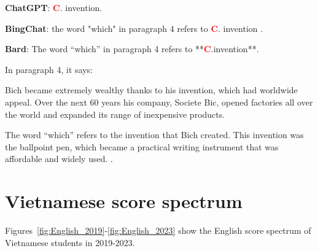 \documentclass[11pt]{article}
\begin{document}
\begin{mdframed}[linewidth=1pt,linecolor=red]
	\textbf{ChatGPT}: \textcolor{red}{\textbf{C}}. invention.  
	
	\textbf{BingChat}:  the word "which" in paragraph 4 refers to \textcolor{red}{\textbf{C}}. invention .
	
	\textbf{Bard}: The word “which” in paragraph 4 refers to **\textcolor{red}{\textbf{C}}.invention**.
	
	In paragraph 4, it says:
	
	Bich became extremely wealthy thanks to his invention, which had worldwide appeal. Over the next 60 years his company, Societe Bic, opened factories all over the world and expanded its range of inexpensive products.
	
	The word “which” refers to the invention that Bich created. This invention was the ballpoint pen, which became a practical writing instrument that was affordable and widely used.
	.
	
\end{mdframed}

\section{Vietnamese score spectrum}
\label{sec:spectrum_appendix}

Figures~\ref{fig:English_2019}-\ref{fig:English_2023} show the English score spectrum of Vietnamese students in 2019-2023.
\end{document}
